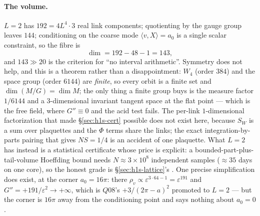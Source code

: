 \paragraph{The volume.} $L=2$ has $192=4L^{4}\cdot3$ real link components; quotienting by the gauge
group leaves $144$; conditioning on the coarse mode $\langle v,X\rangle=a_{0}$ is a single scalar
constraint, so the fibre is
\begin{equation}
\dim=192-48-1=143 ,
\label{eq:h1s-143}
\end{equation}
and $143\gg20$ is the criterion for ``no interval arithmetic''. Symmetry does not help, and this is a
theorem rather than a disappointment: $W_{4}$ (order $384$) and the space group (order $6144$) are
\emph{finite}, so every orbit is a finite set and $\dim(M/G)=\dim M$; the only thing a finite group buys
is the measure factor $1/6144$ and a $3$-dimensional invariant tangent space at the flat point --- which
is the free field, where $G''\equiv0$ and the acid test fails. The per-link $1$-dimensional
factorization that made \S\ref{sec:h1s-cert} possible does not exist here, because $S_{W}$ is a sum over
plaquettes and the $\Phi$ terms share the links; the exact integration-by-parts pairing that gives
$NS=1/4$ is an accident of one plaquette. What $L=2$ has instead is a statistical certificate whose
price is explicit: a bounded-part-plus-tail-volume Hoeffding bound needs $N\approx3\times10^{8}$
independent samples ($\approx35$ days on one core), so the honest grade is \S\ref{sec:h1s-lattice}'s
\LE. One precise simplification does exist, at the corner $a_{0}=16\pi$: there $\rho_{v}\propto
\varepsilon^{3\cdot64-1}=\varepsilon^{191}$ and $G''=+191/\varepsilon^{2}\to+\infty$, which is
$Q08$'s $+3/(2\pi-a)^{2}$ promoted to $L=2$ --- but the corner is $16\pi$ away from the conditioning
point and says nothing about $a_{0}=0$. \LN


